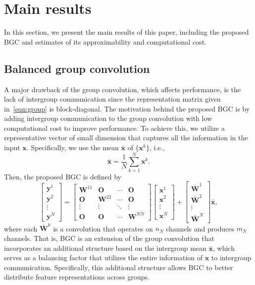 \documentclass[preprint,12pt,authoryear]{elsarticle}
\numberwithin{equation}{section}
\theoremstyle{remark}
\newcommand\bO{\mathbf{O}}
\newcommand\bW{\mathbf{W}}
\newcommand\bx{\mathbf{x}}
\newcommand\by{\mathbf{y}}
\begin{document}
\section{Main results}
\label{Sec:Main}
In this section, we present the main results of this paper, including the proposed BGC and estimates of its approximability and computational cost.

\subsection{Balanced group convolution}
A major drawback of the group convolution, which affects performance, is the lack of intergroup communication since the representation matrix given in~\eqref{eqn:group} is block-diagonal.
The motivation behind the proposed BGC is by adding intergroup communication to the group convolution with low computational cost to improve performance.
To achieve this, we utilize a representative vector of small dimension that captures all the information in the input $\bx$. 
Specifically, we use the mean $\bar{\bx}$ of $\{ \bx^k \}$, i.e.,
\begin{equation*}
    \bar{\bx} = \frac{1}{N}\sum_{k=1}^N \bx^k.
\end{equation*}
Then, the proposed BGC is defined by
\begin{equation}
    \label{eqn:balanced}
    \begin{bmatrix} \by^1 \\ \by^2 \\ \vdots \\ \by^N \end{bmatrix}
    = \begin{bmatrix} \bW^{11} & \bO & \cdots & \bO \\
        \bO & \bW^{22} & \cdots & \bO \\
        \vdots & \vdots & \ddots & \vdots \\
        \bO & \bO & \cdots & \bW^{NN} \end{bmatrix}
    \begin{bmatrix} \bx^1 \\ \bx^2 \\ \vdots \\ \bx^N \end{bmatrix}
    + \begin{bmatrix} \bar{\bW}^1 \\ \bar{\bW}^2 \\ \vdots \\ \bar{\bW}^N \end{bmatrix}
    \bar{\bx},
\end{equation}
where each $\bar{\bW}^k$ is a convolution that operates on $n_N$ channels and produces $m_N$ channels.
That is, BGC is an extension of the group convolution that incorporates an additional structure based on the intergroup mean $\bar{\bx}$, which serves as a balancing factor that utilizes the entire information of $\bx$ to intergroup communication.
Specifically, this additional structure allows BGC to better distribute feature representations across groups.
\end{document}
